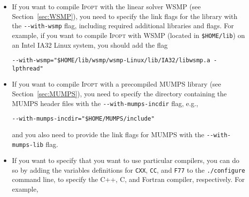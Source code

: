 \documentclass[10pt]{article}
\newcommand{\Ipopt}{\textsc{Ipopt}\xspace}
\begin{document}
\begin{itemize}
  \verb|--with-pardiso="-qsmp=omp $HOME/lib/libpardiso_P4AIX51_64_P.so"|  %

  If you are using the parallel version of Pardiso, you need to
  specify the number of processors it should run on with the
  environment variable \verb|OMP_NUM_THREADS|, as described in the
  Pardiso manual.

  Experimental:
  If you want to compile \Ipopt with the Pardiso library that is included
  in Intel MKL, you have to specify the MKL libs for the \verb|--with-pardiso|
  configure flag and add \verb|-DHAVE_PARDISO_MKL -DHAVE_PARDISO_PARALLEL|
  to the compiler flags, e.g.,
  
  \begin{verbatim}
--with-blas="-L${MKLDIR} -Wl,--start-group -lmkl_def -lmkl_lapack -lmkl_intel_lp64 \
  -lmkl_intel_thread -lmkl_core -lippcoreem64t -Wl,--end-group -liomp5 -lpthread"
--with-pardiso="-L${MKLDIR} -Wl,--start-group -lmkl_def -lmkl_lapack -lmkl_intel_lp64 \
  -lmkl_intel_thread -lmkl_core -lippcoreem64t -Wl,--end-group -liomp5 -lpthread"
ADD_CXXFLAGS="-DHAVE_PARDISO_MKL -DHAVE_PARDISO_PARALLEL"\end{verbatim}
  
\item If you want to compile \Ipopt with the linear solver WSMP (see
  Section~\ref{sec:WSMP}), you need to specify the link flags for the
  library with the \verb|--with-wsmp| flag, including required
  additional libraries and flags.  For example, if you want to compile
  \Ipopt with WSMP (located in {\tt \$HOME/lib}) on an Intel IA32
  Linux system, you should add the flag

  \verb|--with-wsmp="$HOME/lib/wsmp/wsmp-Linux/lib/IA32/libwsmp.a -lpthread"| %

\item If you want to compile \Ipopt with a precompiled MUMPS library
  (see Section~\ref{sec:MUMPS}), you need to specify the directory containing
  the MUMPS header files with the \verb|--with-mumps-incdir| flag,
  e.g.,

  \verb|--with-mumps-incdir="$HOME/MUMPS/include"|  %

  and you also need to provide the link flags for MUMPS with the
  \verb|--with-mumps-lib| flag.

\item If you want to specify that you want to use particular
  compilers, you can do so by adding the variables definitions for
  {\tt CXX}, {\tt CC}, and {\tt F77} to the {\tt ./configure} command
  line, to specify the C++, C, and Fortran compiler, respectively.
  For example,


\end{itemize}
\end{document}
